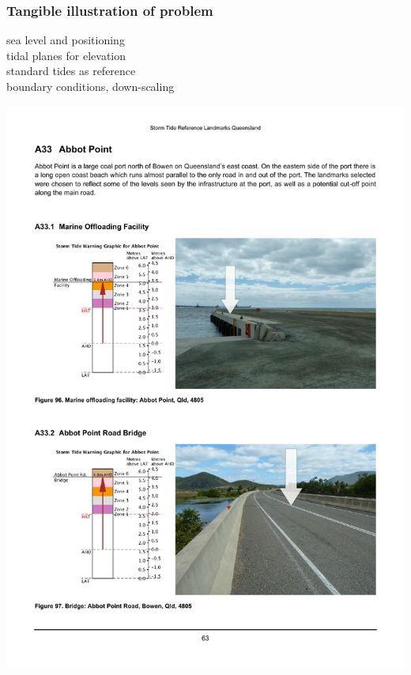 \begin{frame}
\frametitle{Tangible illustration of problem}

\begin{minipage}{0.6\textwidth} 
\centering
      sea level and positioning\\
      
      
      tidal planes for elevation\\
      
      
      standard tides as reference\\
      
      
      boundary conditions, down-scaling
\end{minipage}
\begin{minipage}{0.3\textwidth}
    \includegraphics[trim={2cm 0 5cm 5cm},clip,height=0.9\textheight]{figures/images/qldLandmarkEg.pdf}
\end{minipage}

\end{frame}

